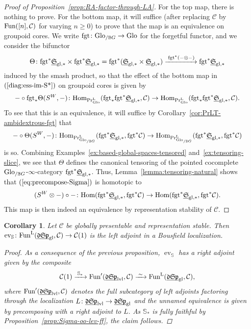 \documentclass[reqno]{memo-l}
\theoremstyle{mythm}
\newtheorem{cor}[thm]{Corollary}
\theoremstyle{definition}
\numberwithin{equation}{section}
\newcommand{\Cc}{{\mathcal{C}}}
\newcommand{\gl}{\textup{gl}}
\DeclareMathOperator{\ev}{ev}
\newcommand{\PrL}{\textup{Pr}^{\textup{L}}}
\renewcommand{\hom}{\textup{hom}}
\newcommand{\Fun}{{\textup{Fun}}}
\renewcommand{\hom}{{\textup{Hom}}}
\newcommand{\fgt}{\textup{fgt}}
\newcommand{\Glo}{\textup{Glo}}
\newcommand{\BGcat}[1]{\mathbb B{#1}}
\newcommand{\ulhelper}[2]{\underline{\setbox0=\hbox{$#1#2$}\dp0=0.4pt \box0\relax}}
\newcommand{\ul}[1]{{\mathpalette\ulhelper{#1}}\hbox{\rule[-2pt]{0pt}{0pt}}}
\newcommand{\iso}{\xrightarrow{\;\smash{\raisebox{-0.25ex}{\ensuremath{\scriptstyle\sim}}}\;}}
\newcommand{\mySp}{{\mathfrak S\kern-.5pt\mathfrak p}}
\newcommand{\myLSp}{{\mathfrak d\kern-.25pt}\mySp}
\newcommand{\ulmySplev}{\ul{\myLSp}_\textup{lvl}}
\newcommand{\myS}{{{\mathfrak S\kern-.4pt}}}
\begin{document}
\begin{proof}[Proof of Proposition~\ref{prop:RA-factor-through-LA}]
        For the top map, there is nothing to prove. For the bottom map, it will suffice (after replacing $\Cc$ by $\Fun([n],\Cc)$ for varying $n\ge0$) to prove that the map is an equivalence on groupoid cores. We write $\fgt\colon\Glo_{/\BGcat{G}}\to\Glo$ for the forgetful functor, and we consider the bifunctor
        \[
            \Theta\colon\fgt^*\ul\myS_{\gl,*}\times\fgt^*\ul\myS_{\gl,*}=\fgt^*(\ul\myS_{\gl,*}\times\ul\myS_{\gl,*})\xrightarrow{\;\fgt^*(-{\otimes}-)}\fgt^*\ul\myS_{\gl,*}
        \]
        induced by the smash product, so that the effect of the bottom map in $(\ref{diag:ess-im-S*})$ on groupoid cores is given by 
        \[
            {-}\circ\fgt_*\Theta(S^W,-)\colon\hom_{\PrL_{\Glo}}(\fgt_*\fgt^*\ul\myS_{\gl,*},\Cc)\to \hom_{\PrL_{\Glo}}(\fgt_*\fgt^*\ul\myS_{\gl,*},\Cc).
        \]
        To see that this is an equivalence, it will suffice by Corollary~\ref{cor:PrLT-ambidextrous-fgt} that
        \begin{equation}\label{eq:precompose-Sigma}
            \hskip2pt{-}\circ\Theta(S^W,-)\colon \hom_{\PrL_{\Glo_{/\BGcat{G}}}}\hskip0pt minus 4pt(\fgt^*\ul\myS_{\gl,*}\hskip0pt minus 1pt,\fgt^*\Cc)\to \hom_{\PrL_{\Glo_{/\BGcat{G}}}}\hskip0pt minus 4pt(\fgt^*\ul\myS_{\gl,*}\hskip0pt minus 1pt,\fgt^*\Cc)\hskip2pt
        \end{equation}
        is so.  Combining Examples~\ref{ex:based-global-spaces-tensored} and~\ref{ex:tensoring-slice}, we see that $\Theta$ defines the canonical tensoring of the pointed cocomplete $\Glo_{/\BGcat{G}}$-$\infty$-category $\fgt^*\ul\myS_{\gl,*}$. Thus, Lemma~\ref{lemma:tensoring-natural} shows that $(\ref{eq:precompose-Sigma})$ is homotopic to
        \[
            (S^W\otimes{-})\circ{-}\colon \hom(\fgt^*\ul\myS_{\gl,*},\fgt^*\Cc)\to\hom(\fgt^*\ul\myS_{\gl,*},\fgt^*\Cc).
        \]
        This map is then indeed an equivalence by representation stability of $\Cc$.
\end{proof}

\begin{cor}
    Let $\Cc$ be globally presentable and representation stable. Then $\ev_{\mathbb S}\colon\Fun^\textup{L}(\ul\myLSp_\gl,\Cc)\to\Cc(1)$ is the left adjoint in a Bousfield localization.
    \begin{proof}
        As a consequence of the previous proposition, $\ev_{\mathbb S}$ has a right adjoint given by the composite
        \[
            \Cc(1)\xrightarrow{\;\mathbb S_*\;}\Fun'(\ulmySplev,\Cc)\iso\Fun^\text{L}(\ul\myLSp_\gl,\Cc),
        \]
        where $\Fun'(\ulmySplev,\Cc)$ denotes the full subcategory of left adjoints factoring through the localization $L\colon\ulmySplev\to\ul\myLSp_\gl$ and the unnamed equivalence is given by precomposing with a right adjoint to $L$. As $\mathbb S_*$ is fully faithful by Proposition~\ref{prop:Sigma-oo-lev-ff}, the claim follows.
    \end{proof}
\end{cor}
\end{document}
